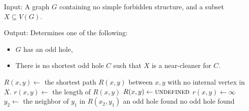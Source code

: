 \begin{alg}
	\label{alg:testNearCleaner}
	Input: A graph $G$ containing no simple forbidden structure, and a subset $X \subseteq V(G)$.

	\noindent Output: Determines one of the following:
	\begin{itemize}
		\item $G$ has an odd hole,
		\item There is no shortest odd hole $C$ such that $X$ is a near-cleaner for $C$.
	\end{itemize}
\end{alg}

\begin{algorithmic}[1]
				\ls $R(x, y) \gets$ the shortest path $R(x, y)$ between $x, y$ with no
				\lsx internal vertex in $X$.
				\ls $r(x, y) \gets$ the length of $R(x, y)$
			\mElse
				\ls $R(x, y) \gets \textsc{undefined}$
				\ls $r(x, y) \gets \infty$
			\mEndIf
			 \label{line:cudaStart}
				 \label{line:3vertex}
					 \label{line:cudaWorkStard}
						\ls $y_2 \gets$ the neighbor of $y_1$ in $R(x_2, y_1)$ \label{line:definey2}
						\ls \RETURN an odd hole found
						\mEndIf
					\mEndIf \label{line:cudaWorkEnd}
				\mEndFor
			\mEndFor \label{line:cudaEnd}
		\mEndFor
		\ls \RETURN no odd hole found
	\mEndProcedure
\end{algorithmic}

